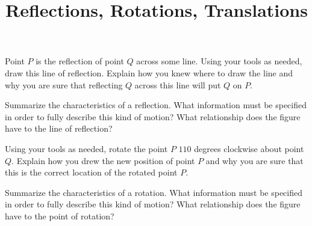 \documentclass[nooutcomes,noauthor, handout]{ximera}
\title{Reflections, Rotations, Translations}
\begin{document}
\begin{abstract}
\end{abstract}
\maketitle


\begin{problem}
Point $P$ is the reflection of point $Q$ across some line.  Using your tools as needed, draw this line of reflection.  Explain how you knew where to draw the line and why you are sure that reflecting $Q$ across this line will put $Q$ on $P$.\\
\vskip 2in
\begin{image}
\end{image}


\end{problem}
\vfill
\begin{problem}
Summarize the characteristics of a reflection.  What information must be specified in order to fully describe this kind of motion?  What relationship does the figure have to the line of reflection?
\end{problem}
\newpage



\begin{problem}
Using your tools as needed, rotate the point $P$ $110$ degrees clockwise about point $Q$.  Explain how you drew the new position of point $P$ and why you are sure that this is the correct location of the rotated point $P$.\\
\vskip 2in
\begin{image}
\end{image}


\end{problem}
\vfill
\begin{problem}
Summarize the characteristics of a rotation.  What information must be specified in order to fully describe this kind of motion?  What relationship does the figure have to the point of rotation?
\end{problem}
\newpage
\end{document}
